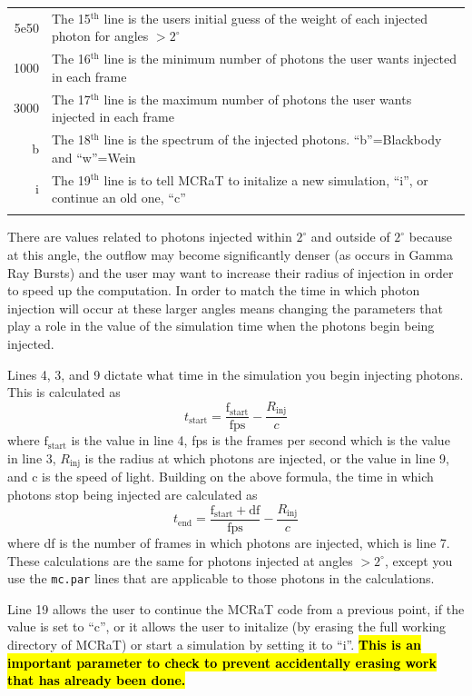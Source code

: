 \documentclass[12pt,a4paper]{article}
\begin{document}
\begin{tabularx}{\linewidth}{r X}
5e50 &    The 15$^\textrm{th}$ line is the users initial guess of the weight of each injected photon for angles $> 2^\circ$\\ 
1000 &   The 16$^\textrm{th}$ line is the minimum number of photons the user wants injected in each frame \\ 
3000 &    The 17$^\textrm{th}$ line is the maximum number of photons the user wants injected in each frame\\ 
b &   The 18$^\textrm{th}$ line is the spectrum of the injected photons. ``b''=Blackbody and ``w''=Wein \\ 
i &    The 19$^\textrm{th}$ line is to tell MCRaT to initalize a new simulation, ``i'', or continue an old one, ``c'' \\ \newline
\end{tabularx} 

There are values related to photons injected within $2^\circ$ and outside of $2^\circ$ because at this angle, the outflow may become significantly denser (as occurs in Gamma Ray Bursts) and the user may want to increase their radius of injection in order to speed up the computation. In order to match the time in which photon injection will occur at these larger angles means changing the parameters that play a role in the value of the simulation time when the photons begin being injected. 

Lines 4, 3, and  9 dictate what time in the simulation you begin injecting photons. This is calculated as 
\[
t_\mathrm{start}=\frac{\mathrm{f_{start}}}{\mathrm{fps}}-\frac{R_\mathrm{inj}}{c}
\]
where $\mathrm{f_{start}}$ is the value in line 4, fps is the frames per second which is the value in line 3, $R_\mathrm{inj}$ is the radius at which photons are injected, or the value in line 9, and c is the speed of light. Building on the above formula, the time in which photons stop being injected are calculated as
\[
t_\mathrm{end}=\frac{\mathrm{f_{start}}+\mathrm{df}}{\mathrm{fps}}-\frac{R_\mathrm{inj}}{c}
\]
where df is the number of frames in which photons are injected, which is line 7. These calculations are the same for photons injected at angles $> 2^\circ$, except you use the \texttt{mc.par} lines that are applicable to those photons in the calculations. 

Line 19 allows the user to continue the MCRaT code from a previous point, if the value is set to ``c'', or it allows the user to initalize (by erasing the full working directory of MCRaT) or start a simulation by setting it to ``i''. \hl{\bf This is an important parameter to check to prevent accidentally erasing work that has already been done.}
\end{document}
